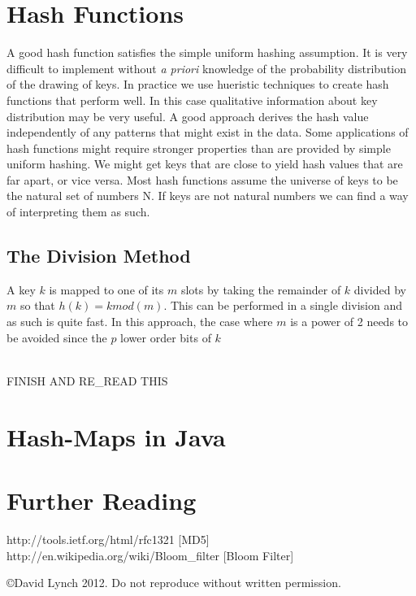 \documentclass[10pt,a4paper]{article}
\begin{document}
\section{Hash Functions}
A good hash function satisfies the simple uniform hashing assumption. It is very difficult to implement without {\it a priori} knowledge of the probability distribution of the drawing of keys. In practice we use hueristic techniques to create hash functions that perform well. In this case qualitative information about key distribution may be very useful. A good approach derives the hash value independently of any patterns that might exist in the data. Some applications of hash functions might require stronger properties than are provided by simple uniform hashing. We might get keys that are close to yield hash values that are far apart, or vice versa. Most hash functions assume the universe of keys to be the natural set of numbers N. If keys are not natural numbers we can find a way of interpreting them as such. 
\subsection{The Division Method}
A key $k$ is mapped to one of its $m$ slots by taking the remainder of $k$ divided by $m$ so that $h(k) = k mod (m)$. This can be performed in a single division and as such is quite fast. In this approach, the case where $m$ is a power of 2 needs to be avoided since the $p$ lower order bits of $k$

\\ FINISH AND RE_READ THIS \\

\section{Hash-Maps in Java}


\section{Further Reading}

http://tools.ietf.org/html/rfc1321 [MD5]
http://en.wikipedia.org/wiki/Bloom_filter [Bloom Filter]

{}

\begin{center}
{\small \copyright  David Lynch 2012. Do not reproduce without written permission.}
\end{center}
\end{document}
